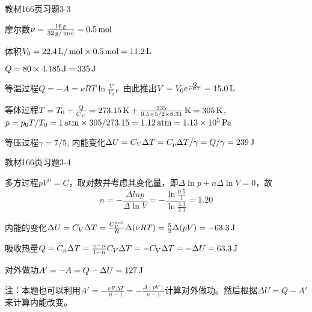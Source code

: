 \documentclass[CJK]{beamer}
\begin{document}
\begin{frame}
  \bch
  教材166页习题3-3
  \ech
\end{frame}

\begin{frame}
  \bch
  摩尔数$\nu = \frac{16\,\mathrm{g}}{32\,\mathrm{g}/\,\mathrm{mol}} = 0.5\,\mathrm{mol}$
  
  体积$V_0 = 22.4\,\mathrm{L}/\,\mathrm{mol} \times 0.5\,\mathrm{mol} = 11.2\,\mathrm{L}$

  $Q = 80\times 4.185 \,\mathrm{J} = 335\,\mathrm{J}$
  \bitem
\item{等温过程$Q = -A = \nu RT \ln\frac{V}{V_0}$，由此推出$V = V_0e^{\frac{Q}{\nu RT}} = 15.0\,\mathrm{L}$}
\item{等体过程$T = T_0+ \frac{Q}{C_V} = 273.15\,\mathrm{K} + \frac{335}{0.5\times 5/2\times 8.31}\,\mathrm{K} = 305\,\mathrm{K}$, $p = p_0 T/T_0 = 1\,\mathrm{atm} \times 305/273.15 = 1.12 \,\mathrm{atm} = 1.13\times 10^5\,\mathrm{Pa}$}
\item{等压过程$\gamma = 7/5$, 内能变化$\Delta U = C_V\Delta T = C_p\Delta T /\gamma = Q/\gamma = 239\,\mathrm{J}$}
  \eitem
  
  \ech
\end{frame}

\begin{frame}
  \bch
  教材166页习题3-4
  \ech
\end{frame}

\begin{frame}
  \bch
      {\small
        \bitem
      \item{
        多方过程$pV^n = C$，取对数并考虑其变化量，即$\Delta \ln p + n \Delta \ln V = 0$，故
        $$n = - \frac{\Delta ln p}{\Delta \ln V} = -\frac{\ln\frac{0.5}{1}}{\ln\frac{4.1}{2.3}} = 1.20 $$}
      \item{内能的变化$\Delta U  = C_V\Delta T = \frac{C_V^{\rm mol}}{R}\Delta (\nu RT) = \frac{5}{2}\Delta(pV) = -63.3\,\mathrm{J}$}
      \item{吸收热量$Q = C_n \Delta T = \frac{\gamma-n}{1-n}C_V\Delta T = -C_V\Delta T = -\Delta U = 63.3\,\mathrm{J}$}
      \item{对外做功$A'=-A = Q-\Delta U = 127\,\mathrm{J}$}
        \eitem
        \skipline
        
注：本题也可以利用$A' = -\frac{\nu R \Delta T}{n-1} =-\frac{\Delta(pV)}{n-1}$计算对外做功。然后根据$\Delta U = Q-A'$来计算内能改变。        
  }
  \ech
\end{frame}
\end{document}
